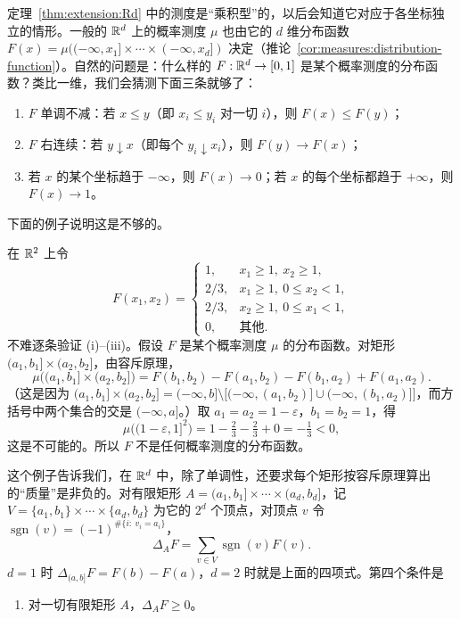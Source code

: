 
定理~\ref{thm:extension:Rd} 中的测度是“乘积型”的，以后会知道它对应于各坐标独立的情形。一般的 $\mathbb{R}^d$ 上的概率测度 $\mu$ 也由它的 $d$ 维分布函数 $F(x)=\mu((-\infty,x_1]\times\cdots\times(-\infty,x_d])$ 决定（推论~\ref{cor:measures:distribution-function}）。自然的问题是：什么样的 $F:\mathbb{R}^d\to[0,1]$ 是某个概率测度的分布函数？类比一维，我们会猜测下面三条就够了：
\begin{enumerate}
\item[(i)] $F$ 单调不减：若 $x\leqslant y$（即 $x_i\leqslant y_i$ 对一切 $i$），则 $F(x)\leqslant F(y)$；
\item[(ii)] $F$ 右连续：若 $y\downarrow x$（即每个 $y_i\downarrow x_i$），则 $F(y)\to F(x)$；
\item[(iii)] 若 $x$ 的某个坐标趋于 $-\infty$，则 $F(x)\to0$；若 $x$ 的每个坐标都趋于 $+\infty$，则 $F(x)\to1$。
\end{enumerate}
下面的例子说明这是不够的。

\begin{example}\label{ex:extension:bad-F}
在 $\mathbb{R}^2$ 上令
\[
F(x_1,x_2)=\begin{cases}1,&x_1\geqslant1,\ x_2\geqslant1,\\ 2/3,&x_1\geqslant1,\ 0\leqslant x_2<1,\\ 2/3,&x_2\geqslant1,\ 0\leqslant x_1<1,\\ 0,&\text{其他}.\end{cases}
\]
不难逐条验证 (i)--(iii)。假设 $F$ 是某个概率测度 $\mu$ 的分布函数。对矩形 $(a_1,b_1]\times(a_2,b_2]$，由容斥原理，
\[
\mu\bigl((a_1,b_1]\times(a_2,b_2]\bigr)=F(b_1,b_2)-F(a_1,b_2)-F(b_1,a_2)+F(a_1,a_2).
\]
（这是因为 $(a_1,b_1]\times(a_2,b_2]=(-\infty,b]\setminus\bigl[(-\infty,(a_1,b_2)]\cup(-\infty,(b_1,a_2)]\bigr]$，而方括号中两个集合的交是 $(-\infty,a]$。）取 $a_1=a_2=1-\varepsilon$，$b_1=b_2=1$，得
\[
\mu\bigl((1-\varepsilon,1]^2\bigr)=1-\tfrac23-\tfrac23+0=-\tfrac13<0,
\]
这是不可能的。所以 $F$ 不是任何概率测度的分布函数。
\end{example}

这个例子告诉我们，在 $\mathbb{R}^d$ 中，除了单调性，还要求每个矩形按容斥原理算出的“质量”是非负的。对有限矩形 $A=(a_1,b_1]\times\cdots\times(a_d,b_d]$，记 $V=\{a_1,b_1\}\times\cdots\times\{a_d,b_d\}$ 为它的 $2^d$ 个顶点，对顶点 $v$ 令 $\operatorname{sgn}(v)=(-1)^{\#\{i:\ v_i=a_i\}}$，
\[
\Delta_AF=\sum_{v\in V}\operatorname{sgn}(v)F(v).
\]
$d=1$ 时 $\Delta_{(a,b]}F=F(b)-F(a)$，$d=2$ 时就是上面的四项式。第四个条件是
\begin{enumerate}
\item[(iv)] 对一切有限矩形 $A$，$\Delta_AF\geqslant0$。
\end{enumerate}

